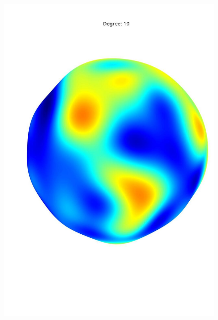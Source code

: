 \documentclass[a4paper]{article}
\theoremstyle{definition}
\begin{document}
\begin{figure}[h!]
\begin{minipage}{.245\textwidth}
        \includegraphics[width=0.95\linewidth]{media/med_10.jpg}
        \label{fig:med10}
    \end{minipage}
    \begin{minipage}{.245\textwidth}
        \centering

\end{minipage}
\end{figure}
\end{document}
